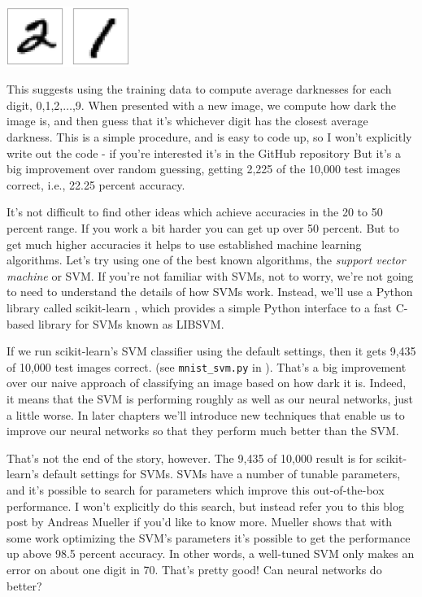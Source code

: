 {\centering
\includegraphics[width=0.3\textwidth,]{pic/digits21}
\par}


This suggests using the training data to compute average darknesses for each digit, 0,1,2,$\ldots$,9. When presented with a new image, we compute how dark the image is, and then guess that it's whichever digit has the closest average darkness. This is a simple procedure, and is easy to code up, so I won't explicitly write out the code - if you're interested it's in the GitHub repository \cite{Nielsengithub2019} But it's a big improvement over random guessing, getting 2,225 of the 10,000 test images correct, i.e., 22.25 percent accuracy.

It's not difficult to find other ideas which achieve accuracies in the 20 to 50 percent range. If you work a bit harder you can get up over 50 percent. But to get much higher accuracies it helps to use established machine learning algorithms. Let's try using one of the best known algorithms, the \textit{support vector machine} or SVM. If you're not familiar with SVMs, not to worry, we're not going to need to understand the details of how SVMs work. Instead, we'll use a Python library called scikit-learn \cite{scikit-learn,scikit-learnwebsite}, which provides a simple Python interface to a fast C-based library for SVMs known as LIBSVM\cite{libsvm}.

If we run scikit-learn's SVM classifier using the default settings, then it gets 9,435 of 10,000 test images correct. (see \lstinline{mnist_svm.py} in  \cite{Nielsengithub2019}). That's a big improvement over our naive approach of classifying an image based on how dark it is. Indeed, it means that the SVM is performing roughly as well as our neural networks, just a little worse. In later chapters we'll introduce new techniques that enable us to improve our neural networks so that they perform much better than the SVM.

That's not the end of the story, however. The 9,435 of 10,000 result is for scikit-learn's default settings for SVMs. SVMs have a number of tunable parameters, and it's possible to search for parameters which improve this out-of-the-box performance. I won't explicitly do this search, but instead refer you to this blog post \cite{Muellermnist2019} by Andreas Mueller if you'd like to know more. Mueller shows that with some work optimizing the SVM's parameters it's possible to get the performance up above 98.5 percent accuracy. In other words, a well-tuned SVM only makes an error on about one digit in 70. That's pretty good! Can neural networks do better?



